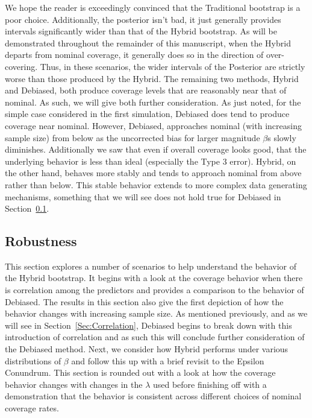 We hope the reader is exceedingly convinced that the Traditional bootstrap is a poor choice. Additionally, the posterior isn't bad, it just generally provides intervals significantly wider than that of the Hybrid bootstrap. As will be demonstrated throughout the remainder of this manuscript, when the Hybrid departs from nominal coverage, it generally does so in the direction of over-covering. Thus, in these scenarios, the wider intervals of the Posterior are strictly worse than those produced by the Hybrid. The remaining two methods, Hybrid and Debiased, both produce coverage levels that are reasonably near that of nominal. As such, we will give both further consideration. As just noted, for the simple case considered in the first simulation, Debiased does tend to produce coverage near nominal. However, Debiased, approaches nominal (with increasing sample size) from below as the uncorrected bias for larger magnitude $\beta$s slowly diminishes. Additionally we saw that even if overall coverage looks good, that the underlying behavior is less than ideal (especially the Type 3 error). Hybrid, on the other hand, behaves more stably and tends to approach nominal from above rather than below. This stable behavior extends to more complex data generating mechanisms, something that we will see does not hold true for Debiased in Section~\ref{Sec:Robustness}.

\subsection{Robustness}\label{Sec:Robustness}

This section explores a number of scenarios to help understand the behavior of the Hybrid bootstrap. It begins with a look at the coverage behavior when there is correlation among the predictors and provides a comparison to the behavior of Debiased. The results in this section also give the first depiction of how the behavior changes with increasing sample size. As mentioned previously, and as we will see in Section~\ref{Sec:Correlation}, Debiased begins to break down with this introduction of correlation and as such this will conclude further consideration of the Debiased method. Next, we consider how Hybrid performs under various distributions of $\beta$ and follow this up with a brief revisit to the Epsilon Conundrum. This section is rounded out with a look at how the coverage behavior changes with changes in the $\lambda$ used before finishing off with a demonstration that the behavior is consistent across different choices of nominal coverage rates.

